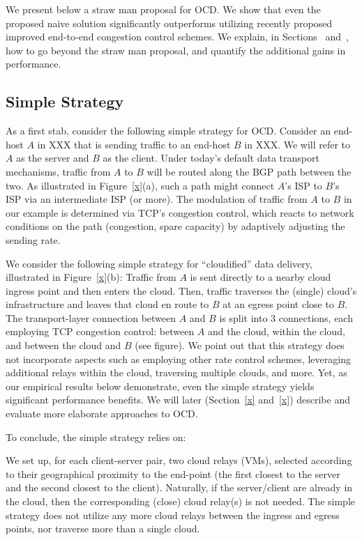 \documentclass[10pt,sigconf]{acmart}
\begin{document}
We present below a straw man proposal for OCD. We show that even the proposed naive solution significantly outperforms utilizing recently proposed improved end-to-end congestion control schemes. We explain, in Sections~\cite{x} and~\cite{x}, how to go beyond the straw man proposal, and quantify the additional gains in performance.

\subsection{Simple Strategy}

As a first stab, consider the following simple strategy for OCD. Consider an end-host $A$ in XXX that is sending traffic to an end-host $B$ in XXX. We will refer to $A$ as the server and $B$ as the client. Under today's default data transport mechanisms, traffic from $A$ to $B$ will be routed along the BGP path between the two. As illustrated in Figure~\ref{x}(a), such a path might connect $A$'s ISP to $B$'s ISP via an intermediate ISP (or more). The modulation of traffic from $A$ to $B$ in our example is determined via TCP's congestion control, which reacts to network conditions on the path (congestion, spare capacity) by adaptively adjusting the sending rate.

We consider the following simple strategy for ``cloudified'' data delivery, illustrated in Figure~\ref{x}(b): Traffic from $A$ is sent directly to a nearby cloud ingress point and then enters the cloud. Then, traffic traverses the (single) cloud's infrastructure and leaves that cloud en route to $B$ at an egress point close to $B$. The transport-layer connection between $A$ and $B$ is split into $3$ connections, each employing TCP congestion control: between $A$ and the cloud, within the cloud, and between the cloud and $B$ (see figure). We point out that this strategy does not incorporate aspects such as employing other rate control schemes, leveraging additional relays within the cloud, traversing multiple clouds, and more. Yet, as our empirical results below demonstrate, even the simple strategy yields significant performance benefits. We will later (Section~\ref{x} and~\ref{x}) describe and evaluate more elaborate approaches to OCD.

To conclude, the simple strategy relies on:

\vspace{0.1in} We set up, for each client-server pair, two cloud relays (VMs), selected according to their geographical proximity to the end-point (the first closest to the server and the second closest to the client). Naturally, if the server/client are already in the cloud, then the corresponding (close) cloud relay(s) is not needed. The simple strategy does not utilize any more cloud relays between the ingress and egress points, nor traverse more than a single cloud.
\end{document}
